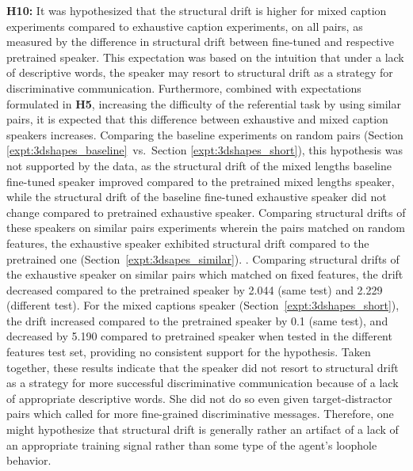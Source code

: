 \textbf{H10:} %
It was hypothesized that the structural drift is higher for mixed caption experiments compared to exhaustive caption experiments, on all pairs, as measured by the difference in structural drift between fine-tuned and respective pretrained speaker. This expectation was based on the intuition that under a lack of descriptive words, the speaker may resort to structural drift as a strategy for discriminative communication. Furthermore, combined with expectations formulated in \textbf{H5}, increasing the difficulty of the referential task by using similar pairs, it is expected that this difference between exhaustive and mixed caption speakers increases. 
Comparing the baseline experiments on random pairs (Section \ref{expt:3dshapes_baseline}~vs.~Section \ref{expt:3dshapes_short}), this hypothesis was not supported by the data, as the structural drift of the mixed lengths baseline fine-tuned speaker improved compared to the pretrained mixed lengths speaker, while the structural drift of the baseline fine-tuned exhaustive speaker did not change compared to pretrained exhaustive speaker. Comparing structural drifts of these speakers on similar pairs experiments wherein the pairs matched on random features, the exhaustive speaker exhibited structural drift compared to the pretrained one (Section~\ref{expt:3dsapes_similar}). . 
Comparing structural drifts of the exhaustive speaker on similar pairs which matched on fixed features, the drift decreased compared to the pretrained speaker by 2.044 (same test) and 2.229 (different test). For the mixed captions speaker (Section~\ref{expt:3dshapes_short}), the drift increased compared to the pretrained speaker by 0.1 (same test), and decreased by 5.190 compared to pretrained speaker when tested in the different features test set, providing no consistent support for the hypothesis. Taken together, these results indicate that the speaker did not resort to structural drift as a strategy for more successful discriminative communication because of a lack of appropriate descriptive words. She did not do so even given target-distractor pairs which called for more fine-grained discriminative messages. Therefore, one might hypothesize that structural drift is generally rather an artifact of a lack of an appropriate training signal rather than some type of the agent's loophole behavior.
\newline

